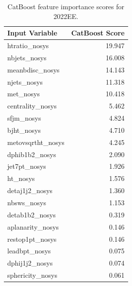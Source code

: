 \documentclass[twoside]{article}
\begin{document}
\begin{table}[htbp]
\centering
\begin{tabular}{l r}
\hline
\textbf{Input Variable} & \textbf{CatBoost Score} \\
\hline
htratio\_nosys       & 19.947 \\
nbjets\_nosys        & 16.008 \\
meanbdisc\_nosys     & 14.143 \\
njets\_nosys         & 11.318 \\
met\_nosys           & 10.418 \\
centrality\_nosys    & 5.462  \\
sfjm\_nosys          & 4.824  \\
bjht\_nosys          & 4.710  \\
metovsqrtht\_nosys   & 4.245  \\
dphib1b2\_nosys      & 2.090  \\
jet7pt\_nosys        & 1.926  \\
ht\_nosys            & 1.576  \\
detaj1j2\_nosys      & 1.360  \\
nbsws\_nosys         & 1.153  \\
detab1b2\_nosys      & 0.319  \\
aplanarity\_nosys    & 0.146  \\
restop1pt\_nosys     & 0.146  \\
leadbpt\_nosys       & 0.075  \\
dphij1j2\_nosys      & 0.074  \\
sphericity\_nosys    & 0.061  \\
\hline
\end{tabular}
\caption{CatBoost feature importance scores for 2022EE.}
\label{tab:catboost_scores_2022EE}
\end{table}
\end{document}
